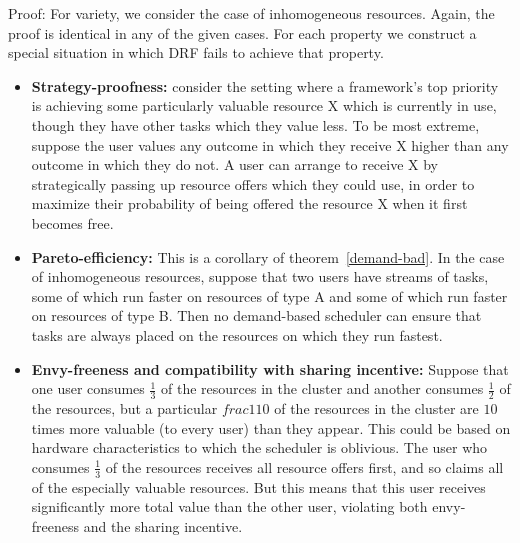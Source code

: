 \documentclass{acm_proc_article-sp}
\begin{document}
Proof: For variety, we consider the case of inhomogeneous resources. Again, the proof is identical in any of the given cases. For each property we construct a special situation in which DRF fails to achieve that property.

\begin{itemize}
\item \textbf{Strategy-proofness:} consider the setting where a framework's top priority is achieving some particularly valuable resource X 
which is currently in use, though they have other tasks which they value less. To be most extreme, suppose the user values any outcome in which they receive X 
higher than any outcome in which they do not. 
A user can arrange to receive X by strategically passing up resource offers which they could use, in order to maximize 
their probability of being offered the resource X when it first becomes free. 
\item \textbf{Pareto-efficiency:} This is a corollary of theorem~\ref{demand-bad}. 
In the case of inhomogeneous resources, suppose that two users have streams of tasks, some of which run faster on resources of type A and some of which run faster on resources of type B. 
Then no demand-based scheduler can ensure that tasks are always placed on the resources on which they run fastest.
\item \textbf{Envy-freeness and compatibility with sharing incentive:} Suppose that one user consumes $\frac 13$ of the resources in the cluster and another consumes $\frac 12$ of the resources, 
but a particular $frac 1{10}$ of the resources in the cluster are $10$ times more valuable (to every user) than they appear. 
This could be based on hardware characteristics to which the scheduler is oblivious. 
The user who consumes $\frac 13$ of the resources receives all resource offers first, and so claims all of the especially valuable resources. 
But this means that this user receives significantly more total value than the other user, violating both envy-freeness and the sharing incentive. 
\end{itemize}
\end{document}
